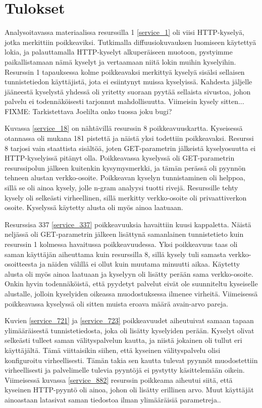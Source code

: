 \section{Tulokset}

Analysoitavassa materiaalissa resurssilla 1 \ref{service_1} oli viisi HTTP-kyselyä, jotka merkittiin poikkeaviksi. Tutkimalla diffuusiokuvauksen
luomiseen käytettyä lokia, ja palauttamalla HTTP-kyselyt alkuperäiseen muotoon, pystyimme paikallistamaan nämä kyselyt ja vertaamaan niitä lokin
muihin kyselyihin. Resurssin 1 tapauksessa kolme poikkeavaksi merkittyä kyselyä sisälsi sellaisen tunnistetiedon käyttäjistä, jota ei esiintynyt 
muissa kyselyissä. Kahdesta jäljelle jääneestä kyselystä yhdessä oli yritetty suoraan pyytää sellaista sivustoa, johon palvelu ei todennäköisesti
tarjonnut mahdollisuutta. Viimeisin kysely sitten... FIXME: Tarkistettava Joelilta onko tuossa joku bugi?

Kuvassa \ref{service_18} on nähtävillä resurssin 8 poikkeavuuskartta. Kyseisessä otannassa oli mukana 181 pistettä ja näistä yksi todettiin poikkeavaksi.
Resurssi 8 tarjosi vain staattista sisältöä, joten GET-parametrin jälkeistä kyselyosuutta ei HTTP-kyselyissä pitänyt olla. Poikkeavassa kyselyssä oli
GET-parametrin resurssipolun jälkeen kuitenkin kysymysmerkki, ja tämän perässä oli pyynnön tehneen alustan verkko-osoite. Poikkeavan kyselyn tunnistaminen
oli helppoa, sillä se oli ainoa kysely, jolle n-gram analyysi tuotti rivejä. Resurssille tehty kysely oli selkeästi virheellinen, sillä merkitty verkko-osoite 
oli privaattiverkon osoite. Kyselyssä käytetty alusta oli myös ainoa laatuaan.

Resurssisa 337 \ref{service_337} poikkeavuuksia havaittiin kuusi kappaletta. Näistä neljässä oli GET-parametrin jälkeen lisättynä samanlainen tunnistetieto
kuin resurssin 1 kolmessa havaitussa poikkeavuudessa. Yksi poikkeavuus taas oli saman käyttäjän aiheuttama kuin resurssilla 8, sillä kysely tuli samasta
verkko-osoitteesta ja näiden välillä ei ollut kuin muutama minuutti aikaa. Käytetty alusta oli myös ainoa laatuaan ja kyselyyn oli lisätty perään
sama verkko-osoite. Onkin hyvin todennäköistä, että pyydetyt palvelut eivät ole suunniteltu kyseiselle alustalle, jolloin kyselyiden oikeassa muodostuksessa ilmenee
virheitä. Viimeisessä poikkeavassa kyselyssä oli sitten muista eroava määrä avain-arvo pareja.

Kuvien \ref{service_721} ja \ref{service_723} poikkeavuudet aiheutuivat samaan tapaan ylimääräisestä tunnistetiedosta, joka oli lisätty kyselyiden perään. Kyselyt olivat selkeästi tulleet
saman välityspalvelun kautta, ja niistä jokainen oli tullut eri käyttäjältä. Tämä viittaisikin siihen, että kyseinen välityspalvelu olisi konfiguroitu virheellisesti. Tämän takia
sen kautta tulevat pyynnöt muodostettiin virheellisesti ja palvelimelle tulevia pyyntöjä ei pystytty käsittelemään oikein. Viimeisessä kuvassa \ref{service_882} resurssin poikkeama aiheutui siitä, 
että kyseinen HTTP-pyyntö oli ainoa, johon oli lisätty erillinen arvo. Muut käyttäjät ainoastaan latasivat saman tiedostoa ilman ylimääräisiä parametreja.. 

